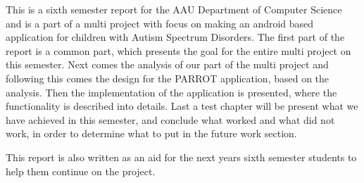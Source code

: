 This is a sixth semester report for the AAU Department of Computer Science and is a part of a multi project with focus on making an android based application for children with Autism Spectrum Disorders. The first part of the report is a common part, which presents the goal for the entire multi project on this semester. Next comes the analysis of our part of the multi project and following this comes the design for the  PARROT application, based on the analysis.
Then the implementation of the application is presented, where the functionality is described into details. 
Last a test chapter will be present what we have achieved in this semester, and conclude what worked and what did not work, in order to determine what to put in the future work section.

This report is also written as an aid for the next years sixth semester students to help them continue on the project.   





